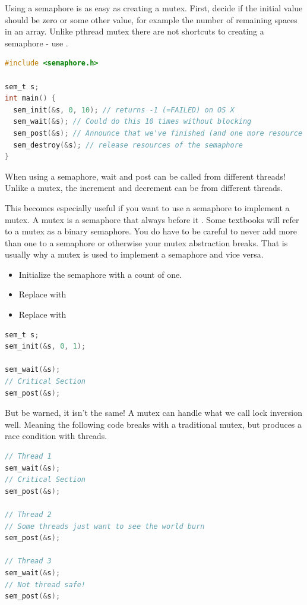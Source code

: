 Using a semaphore is as easy as creating a mutex.
First, decide if the initial value should be zero or some other value, for example the number of remaining spaces in an array.
Unlike pthread mutex there are not shortcuts to creating a semaphore - use .

\begin{lstlisting}[language=C]
#include <semaphore.h>

sem_t s;
int main() {
  sem_init(&s, 0, 10); // returns -1 (=FAILED) on OS X
  sem_wait(&s); // Could do this 10 times without blocking
  sem_post(&s); // Announce that we've finished (and one more resource item is available; increment count)
  sem_destroy(&s); // release resources of the semaphore
}
\end{lstlisting}

When using a semaphore, wait and post can be called from different threads!
Unlike a mutex, the increment and decrement can be from different threads.

This becomes especially useful if you want to use a semaphore to implement a mutex.
A mutex is a semaphore that always  before it .
Some textbooks will refer to a mutex as a binary semaphore.
You do have to be careful to never add more than one to a semaphore or otherwise your mutex abstraction breaks.
That is usually why a mutex is used to implement a semaphore and vice versa.

\begin{itemize}
\item Initialize the semaphore with a count of one.
\item Replace  with 
\item Replace  with 
\end{itemize}

\begin{lstlisting}[language=C]
sem_t s;
sem_init(&s, 0, 1);

sem_wait(&s);
// Critical Section
sem_post(&s);
\end{lstlisting}

But be warned, it isn't the same!
A mutex can handle what we call lock inversion well.
Meaning the following code breaks with a traditional mutex, but produces a race condition with threads.

\begin{lstlisting}[language=C]
// Thread 1
sem_wait(&s);
// Critical Section
sem_post(&s);

// Thread 2
// Some threads just want to see the world burn
sem_post(&s);

// Thread 3
sem_wait(&s);
// Not thread safe!
sem_post(&s);
\end{lstlisting}

